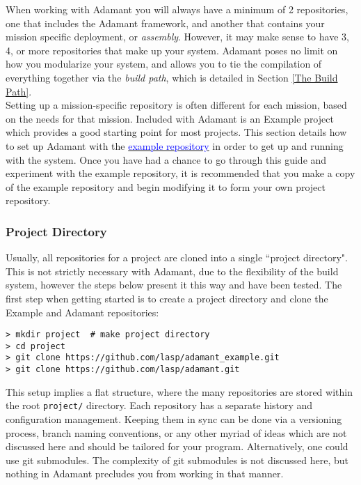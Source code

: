 When working with Adamant you will always have a minimum of 2 repositories, one that includes the Adamant framework, and another that contains your mission specific deployment, or \textit{assembly}. However, it may make sense to have 3, 4, or more repositories that make up your system. Adamant poses no limit on how you modularize your system, and allows you to tie the compilation of everything together via the \textit{build path}, which is detailed in Section \ref{The Build Path}. \\

Setting up a mission-specific repository is often different for each mission, based on the needs for that mission. Included with Adamant is an Example project which provides a good starting point for most projects. This section details how to set up Adamant with the \href{https://github.com/lasp/adamant_example}{\textcolor{blue}{example repository}} in order to get up and running with the system. Once you have had a chance to go through this guide and experiment with the example repository, it is recommended that you make a copy of the example repository and begin modifying it to form your own project repository. \\

\subsubsection{Project Directory}

Usually, all repositories for a project are cloned into a single ``project directory". This is not strictly necessary with Adamant, due to the flexibility of the build system, however the steps below present it this way and have been tested. The first step when getting started is to create a project directory and clone the Example and Adamant repositories:

\vspace{5mm} %
\begin{verbatim}
> mkdir project  # make project directory
> cd project
> git clone https://github.com/lasp/adamant_example.git
> git clone https://github.com/lasp/adamant.git
\end{verbatim}
\vspace{5mm} %

This setup implies a flat structure, where the many repositories are stored within the root \texttt{project/} directory. Each repository has a separate history and configuration management. Keeping them in sync can be done via a versioning process, branch naming conventions, or any other myriad of ideas which are not discussed here and should be tailored for your program. Alternatively, one could use git submodules. The complexity of git submodules is not discussed here, but nothing in Adamant precludes you from working in that manner. \\

